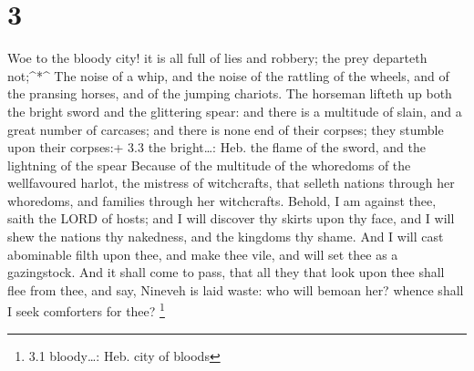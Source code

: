 \hypertarget{section-2}{%
\section{3}\label{section-2}}

 Woe to the bloody city! it is all full of lies and robbery;
the prey departeth not;\^{}*\^{}  The noise of a whip, and
the noise of the rattling of the wheels, and of the pransing horses, and
of the jumping chariots.  The horseman lifteth up both the
bright sword and the glittering spear: and there is a multitude of
slain, and a great number of carcases; and there is none end of their
corpses; they stumble upon their corpses:+ 3.3 the bright\ldots: Heb.
the flame of the sword, and the lightning of the spear 
Because of the multitude of the whoredoms of the wellfavoured harlot,
the mistress of witchcrafts, that selleth nations through her whoredoms,
and families through her witchcrafts.  Behold, I am against
thee, saith the LORD of hosts; and I will discover thy skirts upon thy
face, and I will shew the nations thy nakedness, and the kingdoms thy
shame.  And I will cast abominable filth upon thee, and make
thee vile, and will set thee as a gazingstock.  And it shall
come to pass, that all they that look upon thee shall flee from thee,
and say, Nineveh is laid waste: who will bemoan her? whence shall I seek
comforters for thee? \footnote{3.1 bloody\ldots: Heb. city of bloods}

